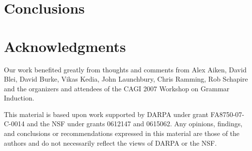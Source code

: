 \documentclass[nocopyrightspace]{sigplanconf}
\begin{document}
\section{Conclusions}
\label{sec:conclusion}


\section*{Acknowledgments}

Our work benefited greatly from thoughts and comments from
Alex Aiken, David Blei, David Burke, Vikas Kedia, John Launchbury, Chris Ramming, 
Rob Schapire
and the organizers and attendees of the CAGI 2007 Workshop on Grammar
Induction.

This material is based upon work 
supported by DARPA under grant FA8750-07-C-0014
and the NSF
   under grants 0612147 and 0615062.
Any opinions, findings, and conclusions or recommendations
   expressed in this material are those of the authors and do not
   necessarily reflect the views of DARPA or the NSF.

\newpage




%
\end{document}
